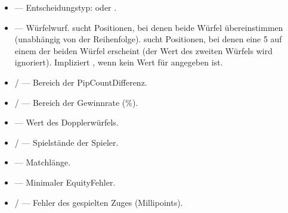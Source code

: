 \documentclass[letterpaper,10pt,german]{sphinxmanual}
\begin{document}
\sphinxAtStartPar
{}
\begin{itemize}
\item {} 
\sphinxAtStartPar
{} — Entscheidungstyp:  oder .

\item {} 
\sphinxAtStartPar
{} — Würfelwurf.  sucht Positionen, bei denen beide Würfel übereinstimmen (unabhängig von der Reihenfolge).  sucht Positionen, bei denen eine 5 auf einem der beiden Würfel erscheint (der Wert des zweiten Würfels wird ignoriert). Impliziert , wenn kein Wert für  angegeben ist.

\item {} 
\sphinxAtStartPar
{} /  — Bereich der Pip\sphinxhyphen{}Count\sphinxhyphen{}Differenz.

\item {} 
\sphinxAtStartPar
{} /  — Bereich der Gewinnrate (\%).

\item {} 
\sphinxAtStartPar
{} — Wert des Dopplerwürfels.

\item {} 
\sphinxAtStartPar
{} /  — Spielstände der Spieler.

\item {} 
\sphinxAtStartPar
{} — Matchlänge.

\item {} 
\sphinxAtStartPar
{} — Minimaler Equity\sphinxhyphen{}Fehler.

\item {} 
\sphinxAtStartPar
{} /  — Fehler des gespielten Zuges (Millipoints).


\end{itemize}
\end{document}

